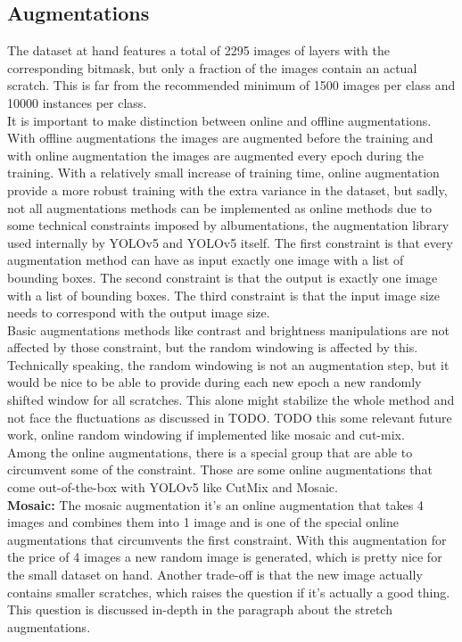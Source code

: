 \subsection{Augmentations}
The dataset at hand features a total of 2295 images of layers with the corresponding bitmask, but only a fraction of the images contain an actual scratch. This is far from the recommended minimum of 1500 images per class and 10000 instances per class. \\
It is important to make distinction between online and offline augmentations. With offline augmentations the images are augmented before the training and with online augmentation the images are augmented every epoch during the training. With a relatively small increase of training time, online augmentation provide a more robust training with the extra variance in the dataset, but sadly, not all augmentations methods can be implemented as online methods due to some technical constraints imposed by albumentations, the augmentation library used internally by YOLOv5 and YOLOv5 itself. The first constraint is that every augmentation method can have as input exactly one image with a list of bounding boxes. The second constraint is that the output is exactly one image with a list of bounding boxes. The third constraint is that the input image size needs to correspond with the output image size. \\
Basic augmentations methods like contrast and brightness manipulations are not affected by those constraint, but the random windowing is affected by this. Technically speaking, the random windowing is not an augmentation step, but it would be nice to be able to provide during each new epoch a new randomly shifted window for all scratches. This alone might stabilize the whole method and not face the fluctuations as discussed in TODO. TODO this some relevant future work, online random windowing if implemented like mosaic and cut-mix.\\
Among the online augmentations, there is a special group that are able to circumvent some of the constraint. Those are some online augmentations that come out-of-the-box with YOLOv5 like CutMix and Mosaic. \\

\textbf{Mosaic:} The mosaic augmentation it's an online augmentation that takes 4 images and combines them into 1 image and is one of the special online augmentations that circumvents the first constraint. With this augmentation for the price of 4 images a new random image is generated, which is pretty nice for the small dataset on hand. Another trade-off is that the new image actually contains smaller scratches, which raises the question if it's actually a good thing. This question is discussed in-depth in the paragraph about the stretch augmentations. \\
 


